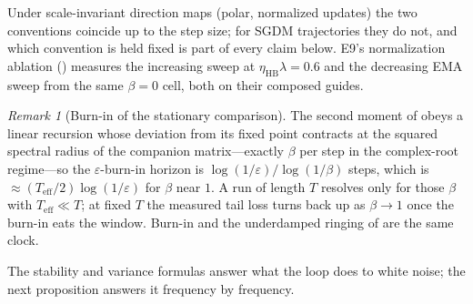 \documentclass[11pt,a4paper]{article}
\theoremstyle{remark}
\newtheorem{remark}{Remark}
\newcommand{\Teff}{T_{\mathrm{eff}}}
\begin{document}
Under scale-invariant direction maps (polar, normalized updates) the two conventions coincide up to the step size; for SGDM trajectories they do not, and which convention is held fixed is part of every claim below.
E9's normalization ablation () measures the increasing sweep at $\eta_{\mathrm{HB}}\lambda=0.6$ and the decreasing EMA sweep from the same $\beta=0$ cell, both on their composed guides.

\begin{remark}[Burn-in of the stationary comparison]
\label{rem:burnin}
The second moment of  obeys a linear recursion whose deviation from its fixed point contracts at the squared spectral radius of the companion matrix---exactly $\beta$ per step in the complex-root regime---so the $\varepsilon$-burn-in horizon is $\log(1/\varepsilon)/\log(1/\beta)$ steps, which is $\approx(\Teff/2)\log(1/\varepsilon)$ for $\beta$ near $1$.
A run of length $T$ resolves  only for those $\beta$ with $\Teff\ll T$; at fixed $T$ the measured tail loss turns back up as $\beta\to1$ once the burn-in eats the window.
Burn-in and the underdamped ringing of  are the same clock.
\end{remark}

The stability and variance formulas answer what the loop does to white noise; the next proposition answers it frequency by frequency.
\end{document}

